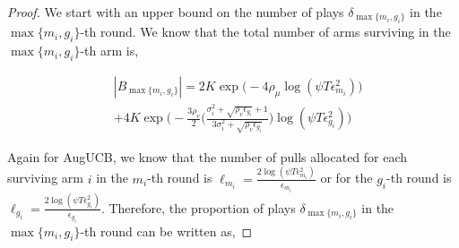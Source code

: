 \begin{proof}
  

We start with an upper bound on the number of plays $\delta_{\max\lbrace m_{i}, g_{i}\rbrace}$ in the $\max\lbrace m_{i}, g_{i}\rbrace$-th round. We know that the total number of arms surviving in the $\max\lbrace m_{i}, g_{i}\rbrace$-th arm is, 

\begin{small}
\begin{align*}
&|B_{\max\lbrace m_{i}, g_{i}\rbrace}|=2K\exp\bigg(-4\rho_{\mu}\log (\psi T\epsilon_{m_{i}}^{2})\bigg)\\ 
& + 4K\exp\bigg(- \frac{3\rho_v}{2} \big(\frac{\sigma_{i}^{2}+\sqrt{\rho_{v}\epsilon_{g_{i}}}+1}{3\sigma_{i}^{2}+\sqrt{\rho_v \epsilon_{g_{i}}}}\big) \log(\psi T\epsilon_{g_{i}}^{2}) \bigg)
\end{align*}     
\end{small}


Again for AugUCB, we know that the number of pulls allocated for each surviving arm $i$ in the $m_{i}$-th round is $\ell_{m_{i}}=\frac{2\log (\psi T \epsilon_{m_{i}}^{2})}{\epsilon_{m_{i}}}$ or for the $g_{i}$-th round is $\ell_{g_{i}}=\frac{2\log (\psi T \epsilon_{g_{i}}^{2})}{\epsilon_{g_{i}}}$. Therefore, the proportion of plays $\delta_{\max\lbrace m_{i}, g_{i}\rbrace}$ in the $\max\lbrace m_{i}, g_{i}\rbrace$-th round can be written as,


\end{proof}
